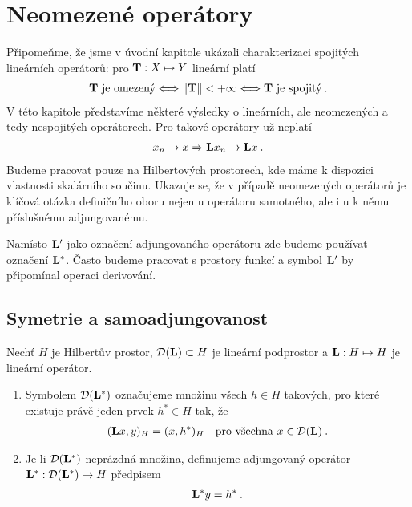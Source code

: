 \section{Neomezené operátory}
Připomeňme, že jsme v úvodní kapitole ukázali charakterizaci spojitých lineárních operátorů: pro $\mathbf{T} :X \mapsto Y$ lineární platí \begin{align*}
    \mathbf{T} \text{ je omezený} \Longleftrightarrow \left\lVert\mathbf{T}\right\rVert < +\infty \Longleftrightarrow \mathbf{T} \text{ je spojitý} \:.
\end{align*}
V této kapitole představíme některé výsledky o lineárních, ale neomezených a tedy nespojitých operátorech. Pro takové operátory už neplatí \begin{align*}
    x_n \rightarrow x \Rightarrow \mathbf{L} x_n \rightarrow \mathbf{L} x \:.
\end{align*}
Budeme pracovat pouze na Hilbertových prostorech, kde máme k dispozici vlastnosti skalárního součinu. Ukazuje se, že v případě neomezených operátorů je klíčová otázka definičního oboru nejen u operátoru samotného, ale i u k němu příslušnému adjungovanému.

Namísto $\mathbf{L}'$ jako označení adjungovaného operátoru zde budeme používat označení $\mathbf{L}^*$. Často budeme pracovat s prostory funkcí a symbol $\mathbf{L}'$ by připomínal operaci derivování.
\subsection{Symetrie a samoadjungovanost}
\begin{definition}
Nechť $H$ je Hilbertův prostor, $\mathcal{D}(\mathbf{L}) \subset H$ je lineární podprostor a $\mathbf{L} : H \mapsto H$ je lineární operátor.
\begin{enumerate}
    \item Symbolem $\mathcal{D}(\mathbf{L}^*)$ označujeme množinu všech $h \in H$ takových, pro které existuje právě jeden prvek $h^* \in H$ tak, že \begin{align*}
        (\mathbf{L} x,y)_H = (x, h^*)_H \quad \text{pro všechna } x \in \mathcal{D}(\mathbf{L}) \:.
    \end{align*}
    \item Je-li $\mathcal{D}(\mathbf{L}^*)$ neprázdná množina, definujeme adjungovaný operátor $\mathbf{L}^* : \mathcal{D}(\mathbf{L}^*) \mapsto H$ předpisem \begin{align*}
        \mathbf{L}^* y = h^* \:.
    \end{align*}
\end{enumerate}
\end{definition}

